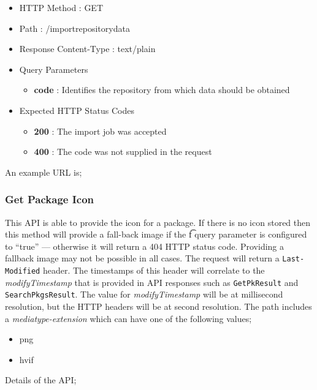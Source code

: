 \begin{itemize}
\item HTTP Method : GET
\item Path : /importrepositorydata
\item Response Content-Type : text/plain
\item Query Parameters
  \begin{itemize}
  \item {\bf code} : Identifies the repository from which data should be obtained
  \end{itemize}
\item Expected HTTP Status Codes
  \begin{itemize}
  \item {\bf 200} : The import job was accepted
  \item {\bf 400} : The code was not supplied in the request
  \end{itemize}
\end{itemize}

An example URL is;


\subsubsection{Get Package Icon}

This API is able to provide the icon for a package.  If there is no icon stored then this method will provide a fall-back image if the {\t f} query parameter is configured to ``true'' --- otherwise it will return a 404 HTTP status code.  Providing a fallback image may not be possible in all cases.  The request will return a {\tt Last-Modified} header.  The timestamps of this header will correlate to the {\it modifyTimestamp} that is provided in API responses such as {\tt GetPkResult} and {\tt SearchPkgsResult}.  The value for {\it modifyTimestamp} will be at millisecond resolution, but the HTTP headers will be at second resolution.  The path includes a {\it mediatype-extension} which can have one of the following values;

\begin{itemize}
\item png
\item hvif
\end{itemize}

Details of the API;

